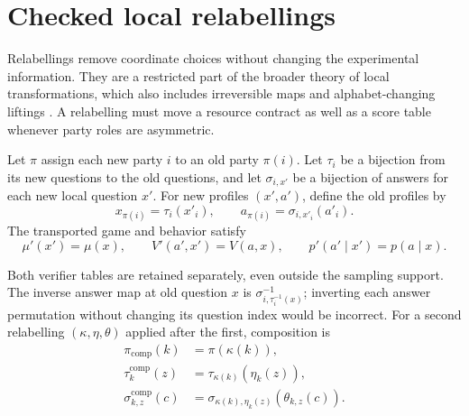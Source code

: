 \section{Checked local relabellings}
\label{sec:relabellings}

Relabellings remove coordinate choices without changing the experimental
information. They are a restricted part of the broader theory of local
transformations, which also includes irreversible maps and alphabet-changing
liftings \cite{rosset2020transformations}. A relabelling must move a resource
contract as well as a score table whenever party roles are asymmetric.

\begin{definition}
Let $\pi$ assign each new party $i$ to an old party $\pi(i)$. Let $\tau_i$
be a bijection from its new questions to the old questions, and let
$\sigma_{i,x'}$ be a bijection of answers for each new local question $x'$.
For new profiles $(x',a')$, define the old profiles by
\[
 x_{\pi(i)}=\tau_i(x'_i),\qquad
 a_{\pi(i)}=\sigma_{i,x'_i}(a'_i).
\]
The transported game and behavior satisfy
\[
 \mu'(x')=\mu(x),\qquad V'(a',x')=V(a,x),\qquad
 p'(a'\mid x')=p(a\mid x).
\]
\end{definition}

Both verifier tables are retained separately, even outside the sampling support.
The inverse answer map at old question $x$ is
$\sigma_{i,\tau_i^{-1}(x)}^{-1}$; inverting each answer permutation without
changing its question index would be incorrect. For a second relabelling
$(\kappa,\eta,\theta)$ applied after the first, composition is
\begin{align*}
 \pi_{\mathrm{comp}}(k)&=\pi(\kappa(k)),\\
 \tau^{\mathrm{comp}}_k(z)&=\tau_{\kappa(k)}(\eta_k(z)),\\
 \sigma^{\mathrm{comp}}_{k,z}(c)&=
 \sigma_{\kappa(k),\eta_k(z)}(\theta_{k,z}(c)).
\end{align*}

